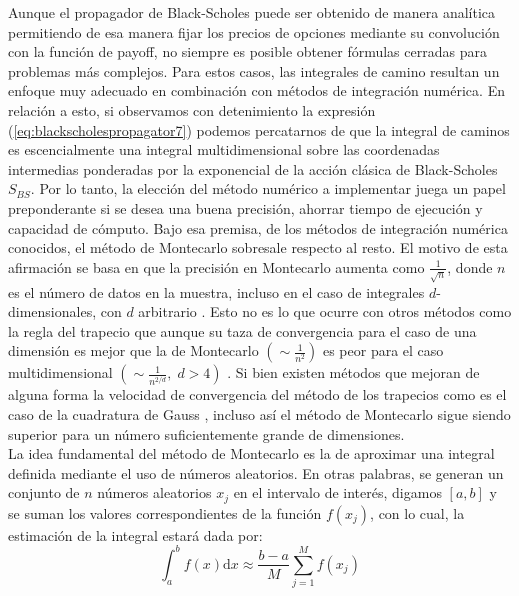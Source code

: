 \documentclass[11pt,a4paper]{article}
\begin{document}
Aunque el propagador de Black-Scholes puede ser obtenido de manera anal\'itica permitiendo de esa manera fijar los precios de opciones mediante su convoluci\'on con la funci\'on de payoff, no siempre es posible obtener f\'ormulas cerradas para problemas m\'as complejos. Para estos casos, las integrales de camino resultan un enfoque muy adecuado en combinaci\'on con m\'etodos de integraci\'on num\'erica. En relaci\'on a esto, si observamos con detenimiento la expresi\'on (\ref{eq:blackscholespropagator7}) podemos percatarnos de que la integral de caminos es escencialmente una integral multidimensional sobre las coordenadas intermedias ponderadas por la exponencial de la acci\'on cl\'asica de Black-Scholes $S_{BS}$. Por lo tanto, la elecci\'on del m\'etodo num\'erico a implementar juega un papel preponderante si se desea una buena precisi\'on, ahorrar tiempo de ejecuci\'on y capacidad de c\'omputo. Bajo esa premisa, de los m\'etodos de integraci\'on num\'erica conocidos, el m\'etodo de Montecarlo sobresale respecto al resto. El motivo de esta afirmaci\'on se basa en que la precisi\'on en Montecarlo aumenta como $\frac{1}{\sqrt{n}}$, donde $n$ es el n\'umero de datos en la muestra, incluso en el caso de integrales $d$-dimensionales, con $d$ arbitrario \cite{cowan1998statistical}. Esto no es lo que ocurre con otros m\'etodos como la regla del trapecio que aunque su taza de convergencia para el caso de una dimensi\'on es mejor que la de Montecarlo $\left( \sim \frac{1}{n^2} \right)$ es peor para el caso multidimensional $\left( \sim \frac{1}{n^{2/d}}, \; d > 4 \right)$ \cite{cowan1998statistical, burden2011numerical, press2007numerical}. Si bien existen m\'etodos que mejoran de alguna forma la velocidad de convergencia del m\'etodo de los trapecios como es el caso de la cuadratura de Gauss \cite{burden2011numerical, press2007numerical}, incluso as\'i el m\'etodo de Montecarlo sigue siendo superior para un n\'umero suficientemente grande de dimensiones. \\
La idea fundamental del m\'etodo de Montecarlo es la de aproximar una integral definida mediante el uso de n\'umeros aleatorios. En otras palabras, se generan un conjunto de $n$ n\'umeros aleatorios $x_j$ en el intervalo de inter\'es, digamos $[a,b]$ y se suman los valores correspondientes de la funci\'on $f(x_j)$, con lo cual, la estimaci\'on de la integral estar\'a dada por:
\begin{equation}
\int_{a}^bf(x)\mathrm{d}x \approx \frac{b-a}{M} \sum_{j=1}^Mf(x_j)
\label{eq:conventionalmontecarlo}
\end{equation}
\end{document}
